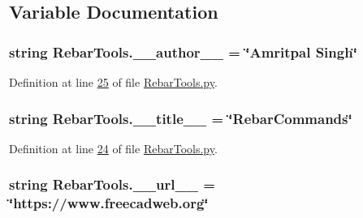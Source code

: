 \subsection{Variable Documentation}
\subsubsection[{\texorpdfstring{\+\_\+\+\_\+author\+\_\+\+\_\+}{__author__}}]{\setlength{\rightskip}{0pt plus 5cm}string Rebar\+Tools.\+\_\+\+\_\+author\+\_\+\+\_\+ = \char`\"{}Amritpal Singh\char`\"{}\hspace{0.3cm}{\ttfamily [private]}}\hypertarget{namespaceRebarTools_a9b758bc71542f069b1d43d0492dfeb35}{}\label{namespaceRebarTools_a9b758bc71542f069b1d43d0492dfeb35}


Definition at line \hyperlink{RebarTools_8py_source_l00025}{25} of file \hyperlink{RebarTools_8py_source}{Rebar\+Tools.\+py}.

\subsubsection[{\texorpdfstring{\+\_\+\+\_\+title\+\_\+\+\_\+}{__title__}}]{\setlength{\rightskip}{0pt plus 5cm}string Rebar\+Tools.\+\_\+\+\_\+title\+\_\+\+\_\+ = \char`\"{}Rebar\+Commands\char`\"{}\hspace{0.3cm}{\ttfamily [private]}}\hypertarget{namespaceRebarTools_a4e380bda06a3907d50e62c4d39b18109}{}\label{namespaceRebarTools_a4e380bda06a3907d50e62c4d39b18109}


Definition at line \hyperlink{RebarTools_8py_source_l00024}{24} of file \hyperlink{RebarTools_8py_source}{Rebar\+Tools.\+py}.

\subsubsection[{\texorpdfstring{\+\_\+\+\_\+url\+\_\+\+\_\+}{__url__}}]{\setlength{\rightskip}{0pt plus 5cm}string Rebar\+Tools.\+\_\+\+\_\+url\+\_\+\+\_\+ = \char`\"{}https\+://www.\+freecadweb.\+org\char`\"{}\hspace{0.3cm}{\ttfamily [private]}}\hypertarget{namespaceRebarTools_ad4d82f49272a3af7991667bf0c7d6998}{}\label{namespaceRebarTools_ad4d82f49272a3af7991667bf0c7d6998}


